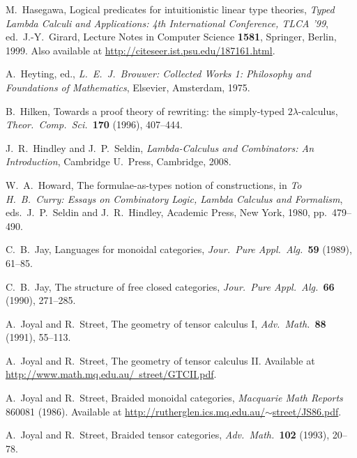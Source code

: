 \documentclass[12pt]{article}
\begin{document}
\begin{thebibliography}{99}
 M.\ Hasegawa, Logical predicates for intuitionistic
linear type theories, {\sl Typed Lambda Calculi and Applications: 4th
International Conference, TLCA '99}, ed.\ J.-Y.\ Girard, Lecture Notes
in Computer Science {\bf 1581}, Springer, Berlin, 1999.
Also available at \href{http://citeseer.ist.psu.edu/187161.html}
{http://citeseer.ist.psu.edu/187161.html}.

 A.\ Heyting, ed., {\sl L.\ E.\ J.\ Brouwer: Collected 
Works 1: Philosophy and Foundations of Mathematics}, Elsevier, Amsterdam,
1975. 

 B.\ Hilken, Towards a proof theory of rewriting: the
simply-typed $2\lambda$-calculus, {\sl Theor.\ Comp.\ Sci.\ }{\bf 170} 
(1996), 407--444.  

 J.\ R.\ Hindley and J.\ P.\ Seldin, {\sl Lambda-Calculus
and Combinators: An Introduction}, Cambridge U.\ Press, Cambridge, 2008.

 W.\ A.\ Howard, The formulae-as-types notion of
constructions, in {\sl To H.\ B.\ Curry: Essays on Combinatory Logic,
Lambda Calculus and Formalism}, eds.\ J.\ P.\ Seldin and J.\ R.\
Hindley, Academic Press, New York, 1980, pp.\ 479--490.

C.\ B.\ Jay, Languages for monoidal categories, 
{\sl Jour.\ Pure Appl.\ Alg.\ }{\bf 59} (1989), 61--85.

C.\ B.\ Jay, The structure of free closed categories, 
{\sl Jour.\ Pure Appl.\ Alg.\ }{\bf 66} (1990), 271--285. 

A.\ Joyal and R.\ Street, The geometry of tensor calculus I, 
{\sl Adv.\ Math.\ }{\bf 88} (1991), 55--113.

A.\ Joyal and R.\ Street, The geometry of tensor calculus II. 
Available at
\hfill \break
\href{http://www.math.mq.edu.au/~street/GTCII.pdf}{ 
http://www.math.mq.edu.au/~street/GTCII.pdf}.

 A.\ Joyal and R.\ Street, Braided monoidal categories,
{\sl Macquarie Math Reports} 860081 (1986).  Available at
\href{http://rutherglen.ics.mq.edu.au/~street/JS86.pdf}{
http://rutherglen.ics.mq.edu.au/$\sim$street/JS86.pdf}.

A.\ Joyal and R.\ Street, Braided tensor categories,
\textsl{Adv.\ Math.\ }\textbf{102} (1993), 20--78.



\end{thebibliography}
\end{document}
